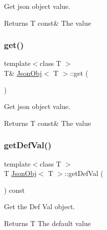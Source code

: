 Get json object value. 

\begin{DoxyReturn}{Returns}
T const\& The value 
\end{DoxyReturn}
\mbox{\label{class_json_obj_a9f155bae279621cb40189b9488d0a3a0}} 
\subsubsection{\texorpdfstring{get()}{get()}\hspace{0.1cm}{\footnotesize\ttfamily [2/2]}}
{\footnotesize\ttfamily template$<$class T $>$ \\
T\& \hyperlink{class_json_obj}{Json\+Obj}$<$ T $>$\+::get (\begin{DoxyParamCaption}{ }\end{DoxyParamCaption})\hspace{0.3cm}{\ttfamily [inline]}}



Get json object value. 

\begin{DoxyReturn}{Returns}
T const\& The value 
\end{DoxyReturn}
\mbox{\label{class_json_obj_a3aa6312aed0218066f20870829c2b044}} 
\subsubsection{\texorpdfstring{get\+Def\+Val()}{getDefVal()}}
{\footnotesize\ttfamily template$<$class T $>$ \\
T \hyperlink{class_json_obj}{Json\+Obj}$<$ T $>$\+::get\+Def\+Val (\begin{DoxyParamCaption}{ }\end{DoxyParamCaption}) const\hspace{0.3cm}{\ttfamily [inline]}}



Get the Def Val object. 

\begin{DoxyReturn}{Returns}
T The default value 
\end{DoxyReturn}
\mbox{\label{class_json_obj_a095b952121c05f145ada6542bd46d532}} 
